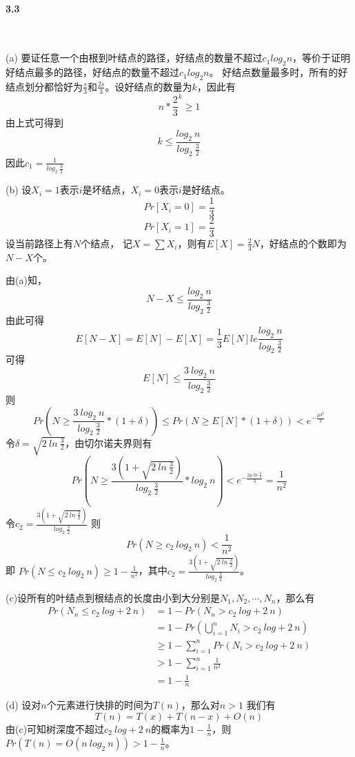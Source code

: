 \paragraph{3.3}~{}

(a)
要证任意一个由根到叶结点的路径，好结点的数量不超过$c_1log_2n$，等价于证明好结点最多的路径，好结点的数量不超过$c_1log_2n$。
好结点数量最多时，所有的好结点划分都恰好为$\frac{s}{3}$和$\frac{2s}{3}$。设好结点的数量为$k$，因此有
$$n*\frac{2}{3}^k \ge 1$$
由上式可得到$$k \le \frac{log_2 \: n}{log_2 \: \frac{3}{2}}$$
因此$c_1 = \frac{1}{log_2 \: \frac{3}{2}}$

(b)
设$X_i=1$表示$i$是坏结点，$X_i=0$表示$i$是好结点。
$$Pr[X_i=0] = \frac{1}{3}$$
$$Pr[X_i=1] = \frac{2}{3}$$
设当前路径上有$N$个结点，
记$X=\sum X_i$，则有$E[X] = \frac{2}{3}N$，好结点的个数即为$N-X$个。

由(a)知，$$N-X \le \frac{log_2 \: n}{log_2 \: \frac{3}{2}} $$
由此可得
$$
E[N-X] = E[N] - E[X] = \frac{1}{3}E[N] le \frac{log_2 \: n}{log_2 \: \frac{3}{2}} 
$$
可得$$E[N] \le \frac{3 \:log_2 \: n}{log_2 \: \frac{3}{2}}$$
则
$$
Pr(N \ge \frac{3 \:log_2 \: n}{log_2 \: \frac{3}{2}} *(1+\delta))
\le Pr(N \ge E[N] *(1+\delta))<e^{-\frac{\mu \delta^2}{3}}
$$
令$\delta = \sqrt{2\:ln\:\frac{3}{2}}$，由切尔诺夫界则有
$$Pr(N \ge \frac{3(1+\sqrt{2\:ln\:\frac{3}{2}})}{log_2 \: \frac{3}{2}} * log_2\:n) < e^{-\frac{2\mu \:ln\:\frac{3}{2}}{3}} = \frac{1}{n^2}$$
令$c_2 = \frac{3(1+\sqrt{2\:ln\:\frac{3}{2}})}{log_2 \: \frac{3}{2}}$ 则
$$Pr(N \ge c_2\:log_2\:n) < \frac{1}{n^2}$$ 即
$Pr(N \le c_2\:log_2\:n) \ge 1-\frac{1}{n^2}$，其中$c_2 = \frac{3(1+\sqrt{2\:ln\:\frac{3}{2}})}{log_2 \: \frac{3}{2}}$。

(c)设所有的叶结点到根结点的长度由小到大分别是$N_1,N_2,\cdots,N_n$，那么有
$$
\begin{aligned}
    Pr(N_n \le c_2\:log+2\:n) &= 1 - Pr(N_n > c_2\:log+2\:n) \\
    &= 1-Pr(\bigcup_{i=1}^n N_i > c_2\:log+2\:n) \\
    &\ge 1-\sum_{i=1}^n Pr(N_i > c_2\:log+2\:n) \\
    &> 1-\sum_{i=1}^n \frac{1}{n^2} \\
    &=1 - \frac{1}{n}
\end{aligned}
$$


(d) 设对$n$个元素进行快排的时间为$T(n)$，那么对$n > 1$ 我们有$$T(n) = T(x)+T(n-x)+O(n)$$
由(c)可知树深度不超过$ c_2\:log+2\:n$的概率为$1-\frac{1}{n}$，则$Pr(T(n) = O(n \: log_2 \: n)) >  1-\frac{1}{n}$。